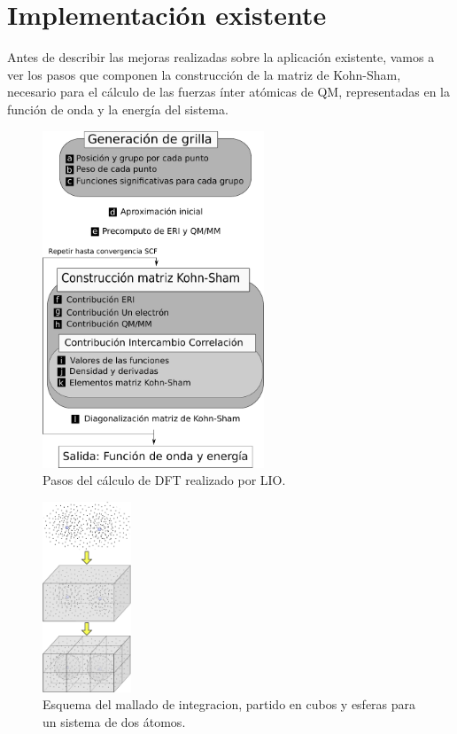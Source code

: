 \section{Implementaci\'on existente}
Antes de describir las mejoras realizadas sobre la aplicaci\'on existente, vamos a ver
los pasos que componen la construcci\'on de la matriz de Kohn-Sham, necesario para el
c\'alculo de las fuerzas \'inter at\'omicas de QM, representadas en la funci\'on de onda y
la energ\'ia del sistema.

\begin{figure}[htbp]
   \centering
   \includegraphics[width=250px]{images/g2g-steps.pdf}
   \caption{Pasos del c\'alculo de DFT realizado por LIO.}
   \label{fig:lio-steps}
\end{figure}

\begin{figure}[htbp]
   \centering
   \includegraphics[width=100px]{images/grilla.pdf}
   \caption{Esquema del mallado de integracion, partido en cubos y esferas para un sistema de dos \'atomos.}
   \label{fig:grilla}
\end{figure}


